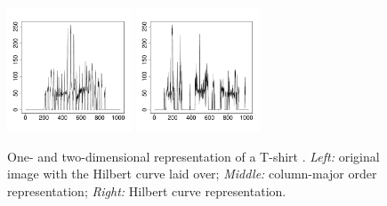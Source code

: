 \begin{figure}[t!]
  \centering
{} \hspace{-2mm}
\includegraphics[width=0.33\textwidth]{figures/Fig6MiddleT-shirt.pdf}
\includegraphics[width=0.33\textwidth]{figures/Fig6RightT-shirt.pdf}
  \caption{\footnotesize One- and two-dimensional representation of a  T-shirt . \emph{ Left:} original image with the Hilbert curve laid over;
  \emph{ Middle:} column-major order representation; 
  \emph{ Right:} Hilbert curve representation.}
  \label{HC}
  \end{figure}

